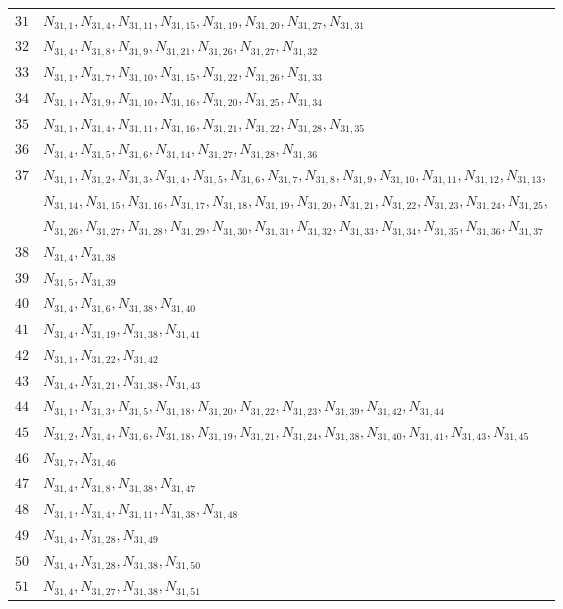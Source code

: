 \documentclass{amsart}
\theoremstyle{plain}
\theoremstyle{definition}
\theoremstyle{remark}
\begin{document}
{\begin{longtable}{ll}
$31$ & $N_{31,1}, N_{31,4}, N_{31,11}, N_{31,15}, N_{31,19}, N_{31,20}, N_{31,27}, N_{31,31}$\\
$32$ & $N_{31,4}, N_{31,8}, N_{31,9}, N_{31,21}, N_{31,26}, N_{31,27}, N_{31,32}$\\
$33$ & $N_{31,1}, N_{31,7}, N_{31,10}, N_{31,15}, N_{31,22}, N_{31,26}, N_{31,33}$\\
$34$ & $N_{31,1}, N_{31,9}, N_{31,10}, N_{31,16}, N_{31,20}, N_{31,25}, N_{31,34}$\\
$35$ & $N_{31,1}, N_{31,4}, N_{31,11}, N_{31,16}, N_{31,21}, N_{31,22}, N_{31,28}, N_{31,35}$\\
$36$ & $N_{31,4}, N_{31,5}, N_{31,6}, N_{31,14}, N_{31,27}, N_{31,28}, N_{31,36}$\\
$37$ & $N_{31,1}, N_{31,2}, N_{31,3}, N_{31,4}, N_{31,5}, N_{31,6}, N_{31,7}, N_{31,8}, N_{31,9}, N_{31,10}, N_{31,11}, N_{31,12}, N_{31,13}$,\\
 & $N_{31,14}, N_{31,15}, N_{31,16}, N_{31,17}, N_{31,18}, N_{31,19}, N_{31,20}, N_{31,21}, N_{31,22}, N_{31,23}, N_{31,24}, N_{31,25}$,\\ 
 & $N_{31,26}, N_{31,27}, N_{31,28}, N_{31,29}, N_{31,30}, N_{31,31}, N_{31,32}, N_{31,33}, N_{31,34}, N_{31,35}, N_{31,36}, N_{31,37}$\\
$38$ & $N_{31,4}, N_{31,38}$\\
$39$ & $N_{31,5}, N_{31,39}$\\
$40$ & $N_{31,4}, N_{31,6}, N_{31,38}, N_{31,40}$\\
$41$ & $N_{31,4}, N_{31,19}, N_{31,38}, N_{31,41}$\\
$42$ & $N_{31,1}, N_{31,22}, N_{31,42}$\\
$43$ & $N_{31,4}, N_{31,21}, N_{31,38}, N_{31,43}$\\
$44$ & $N_{31,1}, N_{31,3}, N_{31,5}, N_{31,18}, N_{31,20}, N_{31,22}, N_{31,23}, N_{31,39}, N_{31,42}, N_{31,44}$\\
$45$ & $N_{31,2}, N_{31,4}, N_{31,6}, N_{31,18}, N_{31,19}, N_{31,21}, N_{31,24}, N_{31,38}, N_{31,40}, N_{31,41}, N_{31,43}, N_{31,45}$\\
$46$ & $N_{31,7}, N_{31,46}$\\
$47$ & $N_{31,4}, N_{31,8}, N_{31,38}, N_{31,47}$\\
$48$ & $N_{31,1}, N_{31,4}, N_{31,11}, N_{31,38}, N_{31,48}$\\
$49$ & $N_{31,4}, N_{31,28}, N_{31,49}$\\
$50$ & $N_{31,4}, N_{31,28}, N_{31,38}, N_{31,50}$\\
$51$ & $N_{31,4}, N_{31,27}, N_{31,38}, N_{31,51}$\\

\end{longtable}}
\end{document}
